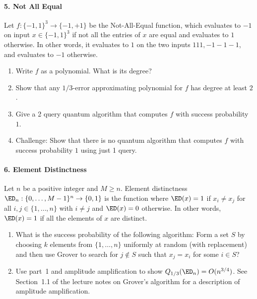 \paragraph*{5. Not All Equal}
Let $f: \{-1,1\}^3 \rightarrow \{-1,+1\}$ be the Not-All-Equal function, which evaluates to $-1$ on 
input $x \in \{-1,1\}^3$ if not all the entries of $x$ are equal and evaluates to $1$ otherwise.  In other 
words, it evaluates to $1$ on the two inputs $111, -1 -1 -1$, and evaluates to $-1$ otherwise.  
\begin{enumerate}
  \item Write $f$ as a polynomial.  What is its degree?
  \item Show that any $1/3$-error approximating polynomial for $f$ has degree at least $2$.  
  \item Give a 2 query quantum algorithm that computes $f$ with success probability $1$.
  \item Challenge: Show that there is no quantum algorithm that computes $f$ with success probability $1$ 
  using just 1 query.
\end{enumerate}

\paragraph*{6. Element Distinctness}
Let $n$ be a positive integer and $M \ge n$.  Element distinctness $\ED_n : \{0, \ldots, M-1\}^n \rightarrow \{0,1\}$ is the function where 
$\ED(x) = 1$ if $x_i \ne x_j$ for all $i,j \in \{1, \ldots, n\}$ with $i \ne j$ and $\ED(x) = 0$ otherwise.  In other words, $\ED(x)=1$ if all the 
elements of $x$ are distinct.
\begin{enumerate}
  \item What is the success probability of the following algorithm: Form a set $S$ by choosing $k$ elements from $\{1, \ldots, n\}$ uniformly at random (with 
  replacement) and then use Grover to search for $j \not \in S$ such that $x_j = x_i$ for some $i \in S$?
  \item Use part~1 and amplitude amplification to show $Q_{1/3}(\ED_n) = O(n^{3/4})$.  See Section~1.1 of the lecture notes on Grover's algorithm for a description of 
  amplitude amplification.
\end{enumerate}


















